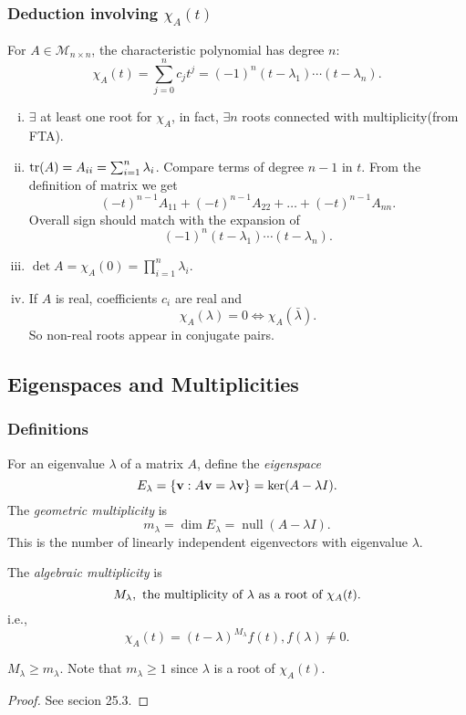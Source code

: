 \documentclass[10pt]{article}
\def\ge{\geqslant}
\DeclareMathOperator{\nullity}{null}
\begin{document}
    \subsubsection{Deduction involving $ \chi_A(t) $}
    For $ A\in \mathcal{M}_{n\times n} $, the characteristic polynomial has degree $n$:
    \[
        \chi_A(t)=\sum_{j=0}^{n}c_jt^j=(-1)^n(t-\lambda_1)\cdots(t-\lambda_n)
    .\]
    \begin{enumerate}[(i)]
        \item $ \exists  $ at least one root for $ \chi_A $, in fact, $ \exists n$ roots connected with multiplicity(from FTA).
        \item $ \tr(A)=A_{ii}=\sum_{i=1}^{n}\lambda_i $. Compare terms of degree $n-1$ in $t$. From the definition of matrix we get 
        \[
            (-t)^{n-1} A_{11}+(-t)^{n-1} A_{22}+\ldots+(-t)^{n-1} A_{n n}
        .\]
        Overall sign should match with the expansion of 
        \[
            (-1)^n(t-\lambda_1)\cdots(t-\lambda_n)
        .\]
        \item $ \det A = \chi_A(0)=\prod_{i=1}^{n}\lambda_i $.
        \item If $A$ is real, coefficients $c_i$ are real and 
        \[
            \chi_A(\lambda)=0 \Longleftrightarrow \chi_A(\bar{\lambda})
        .\]
        So non-real roots appear in conjugate pairs.
    \end{enumerate}
    \subsection{Eigenspaces and Multiplicities}
    \subsubsection{Definitions}
    \begin{definition}
        For an eigenvalue $ \lambda $ of a matrix $A$, define the \textit{eigenspace}
        \[
            E_\lambda=\left\{ {\bf v}:A{\bf v}=\lambda{\bf v} \right\}=\ker (A-\lambda I) 
        .\]
        The \textit{geometric multiplicity} is 
        \[
            m_\lambda=\dim E_\lambda=\nullity(A-\lambda I)
        .\]
        This is the number of linearly independent eigenvectors with eigenvalue $ \lambda $.

        The \textit{algebraic multiplicity} is
        \[
            M_\lambda, \text{ the multiplicity of $\lambda$ as a root of $ \chi_A(t) $}
        .\]
        i.e.,
        \[
            \chi_A(t)=(t-\lambda)^{M_\lambda}f(t), f(\lambda)\neq 0
        .\]
    \end{definition}
    \begin{proposition}
        $ M_\lambda\ge m_\lambda $. Note that $ m_\lambda\ge 1 $ since $ \lambda $ is a root of $ \chi_A(t) $.
    \end{proposition}
    \begin{proof}
        See secion 25.3.
    \end{proof}\newpage
\end{document}
